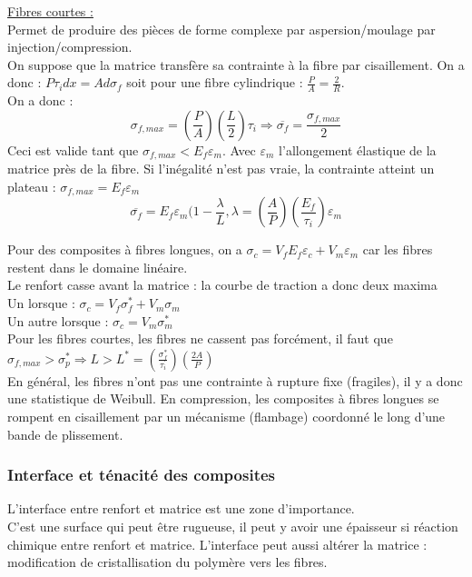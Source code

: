 \documentclass[../main.tex]{subfiles}
\begin{document}
\quad \underline{Fibres courtes :}\\
Permet de produire des pièces de forme complexe par aspersion/moulage par injection/compression.\\
On suppose que la matrice transfère sa contrainte à la fibre par cisaillement. On a donc : $P\tau_i dx = Ad\sigma_f$ soit pour une fibre cylindrique : $\frac{P}{A} = \frac{2}{R}$.\\
On a donc :\\
\begin{equation}
    \sigma_{f,max} = (\frac{P}{A}) (\frac{L}{2})\tau_i \Rightarrow \overline{\sigma_f} = \frac{\sigma_{f,max}}{2}
\end{equation}
Ceci est valide tant que $\sigma_{f,max} < E_f \varepsilon_m$. Avec $\varepsilon_m$ l'allongement élastique de la matrice près de la fibre. Si l'inégalité n'est pas vraie, la contrainte atteint un plateau : $\sigma_{f,max} = E_f\varepsilon_m$ \\
\begin{equation}
    \overline{\sigma_f} = E_f\varepsilon_m(1-\frac{\lambda}{L}, \lambda = (\frac{A}{P}) (\frac{E_f}{\tau_i}) \varepsilon_m
\end{equation}

Pour des composites à fibres longues, on a $\sigma_c = V_fE_f\varepsilon_c + V_m\varepsilon_m$ car les fibres restent dans le domaine linéaire. \\

Le renfort casse avant la matrice : la courbe de traction a donc deux maxima\\
Un lorsque : $\sigma_c = V_f \sigma_f^* + V_m \sigma_m$\\
Un autre lorsque : $\sigma_c = V_m \sigma_m^*$\\

Pour les fibres courtes, les fibres ne cassent pas forcément, il faut que $\sigma_{f,max} > \sigma_p^* \Rightarrow L > L^* = (\frac{\sigma_f^*}{\tau_i})(\frac{2A}{P})$\\

En général, les fibres n'ont pas une contrainte à rupture fixe (fragiles), il y a donc une statistique de Weibull. En compression, les composites à fibres longues se rompent en cisaillement par un mécanisme (flambage) coordonné le long d'une bande de plissement.\\

\subsubsection{Interface et ténacité des composites}
L'interface entre renfort et matrice est une zone d'importance.\\
C'est une surface qui peut être rugueuse, il peut y avoir une épaisseur si réaction chimique entre renfort et matrice. L'interface peut aussi altérer la matrice : modification de cristallisation du polymère vers les fibres.\\
\end{document}
